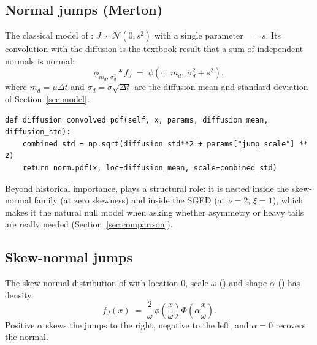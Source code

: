 \subsection{Normal jumps (Merton)}
\label{sec:normal}

The classical model of \citet{Merton1976}: $J \sim \mathcal N(0, s^2)$
with a single parameter ~$= s$. Its convolution with the
diffusion is the textbook result that a sum of independent normals is
normal:
\begin{equation}
  \phi_{m_d,\,\sigma_d^2} * f_J
  \;=\;
  \phi\!\left(\cdot\,;\ m_d,\ \sigma_d^2 + s^2\right),
  \label{eq:normal-conv}
\end{equation}
where $m_d = \mu\Delta t$ and $\sigma_d = \sigma\sqrt{\Delta t}$ are the
diffusion mean and standard deviation of Section~\ref{sec:model}.

\begin{lstlisting}[caption={Closed-form convolution \eqref{eq:normal-conv} in \code{distributions/normal.py}.}]
def diffusion_convolved_pdf(self, x, params, diffusion_mean, diffusion_std):
    combined_std = np.sqrt(diffusion_std**2 + params["jump_scale"] ** 2)
    return norm.pdf(x, loc=diffusion_mean, scale=combined_std)
\end{lstlisting}

Beyond historical importance,  plays a structural role:
it is nested inside the skew-normal family (at zero skewness) and inside
the SGED (at $\nu = 2$, $\xi = 1$), which makes it the natural null model
when asking whether asymmetry or heavy tails are really needed
(Section~\ref{sec:comparison}).

\subsection{Skew-normal jumps}
\label{sec:skewnormal}

The skew-normal distribution of \citet{Azzalini1985} with location $0$,
scale $\omega$ () and shape $\alpha$ ()
has density
\begin{equation}
  f_J(x)
  \;=\;
  \frac{2}{\omega}\,
  \phi\!\left(\frac{x}{\omega}\right)
  \Phi\!\left(\alpha \frac{x}{\omega}\right).
  \label{eq:sn-pdf}
\end{equation}
Positive $\alpha$ skews the jumps to the right, negative to the left, and
$\alpha = 0$ recovers the normal.

